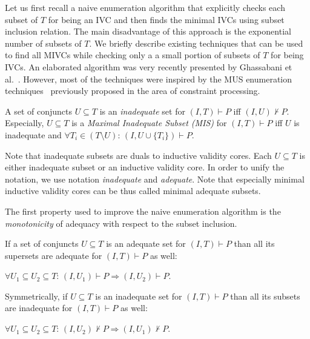 \newcommand{\fUnex}{f_{\mathit{Unexplored}}}
Let us first recall 
a naive enumeration algorithm that   explicitly checks each subset of $T$ for being an IVC  and then finds the minimal IVCs  using subset inclusion relation. The main disadvantage of this approach is the   exponential number of subsets of $T$.
We briefly describe existing techniques that can be used to find all MIVCs while checking only a a small portion of subsets of $T$  for being IVCs.  An elaborated algorithm was     very recently presented by Ghassabani et al.~\cite{}. However,  most of the techniques were inspired by the MUS enumeration techniques~\cite{} previously proposed in the area of constraint processing. 



\begin{definition}[Inadequacy] A set of conjuncts  $U \subseteq T$  is an \emph{inadequate} set for $(I, T) \vdash P$ iff $(I, U) \nvdash P$. Especially, $U \subseteq T$ is a \emph{Maximal Inadequate Subset (MIS)} for $(I, T) \vdash P$ iff $U$ is inadequate and $\forall T_i \in (T \setminus U): \, (I, U \cup \{ T_i\}) \vdash P$.
\end{definition}

Note that inadequate subsets are duals to inductive validity cores. Each $U \subseteq T$ is either inadequate subset or an inductive validity core. In order to unify the notation, we   use notation \emph{inadequate} and \emph{adequate}. Note that especially minimal inductive validity cores can be thus called  minimal adequate subsets.  



The first property used to improve the naive enumeration algorithm is the \emph{monotonicity} of  adequacy   with respect to the subset inclusion.

\begin{lemma}[Monotonicity]
\label{lemma:monotonicity}
If a set of conjuncts  $U \subseteq T$  is an adequate set for $(I, T) \vdash P$   than all its supersets are adequate for  $(I, T) \vdash P$ as well:
\begin{center}
$\forall U_1 \subseteq U_2 \subseteq T: \, (I, U_1) \vdash P \Rightarrow (I, U_2) \vdash P$.
\end{center}
Symmetrically, if   $U \subseteq T$  is an inadequate set for $(I, T) \vdash P$   than all its subsets are inadequate for  $(I, T) \vdash P$ as well:
\begin{center}
$\forall U_1 \subseteq U_2 \subseteq T: \, (I, U_2) \nvdash P \Rightarrow (I, U_1) \nvdash P$.
\end{center}
\end{lemma}

